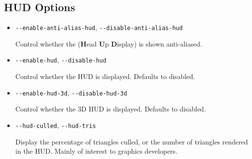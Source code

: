 {
  \subsection{HUD Options}
  \begin{itemize}
  \item{\texttt{-$ $-enable-anti-alias-hud}, \texttt{-$ $-disable-anti-alias-hud}}

  Control whether the  (\textbf{H}ead \textbf{U}p  \textbf{D}isplay) is shown anti-aliased.

  \item{\texttt{-$ $-enable-hud}, \texttt{-$ $-disable-hud}}

  Control whether the HUD is displayed. Defaults to disabled.

  \item{\texttt{-$ $-enable-hud-3d}, \texttt{-$ $-disable-hud-3d}}

  Control whether the 3D HUD is displayed. Defaults to disabled.

  \item{\texttt{-$ $-hud-culled}, \texttt{-$ $-hud-tris}}

  Display the percentage of triangles culled, or the number of triangles rendered in the HUD. Mainly
  of interest to graphics developers.

  \end{itemize}
}


